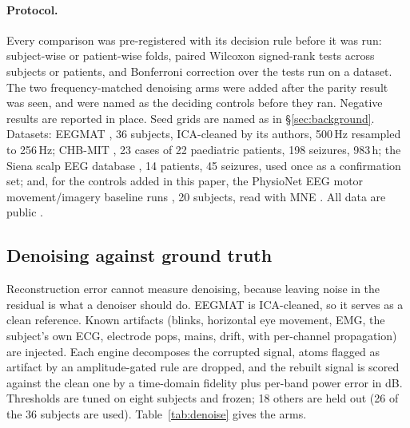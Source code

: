 \documentclass{article}
\begin{document}
\paragraph{Protocol.} Every comparison was pre-registered with its decision rule before it was run: subject-wise or patient-wise folds, paired Wilcoxon signed-rank tests across subjects or patients, and Bonferroni correction over the tests run on a dataset. The two frequency-matched denoising arms were added after the parity result was seen, and were named as the deciding controls before they ran. Negative results are reported in place. Seed grids are named as in \S\ref{sec:background}. Datasets: EEGMAT \citep{zyma2019eegmat}, 36 subjects, ICA-cleaned by its authors, 500\,Hz resampled to 256\,Hz; CHB-MIT \citep{shoeb2009application}, 23 cases of 22 paediatric patients, 198 seizures, 983\,h; the Siena scalp EEG database \citep{detti2020siena}, 14 patients, 45 seizures, used once as a confirmation set; and, for the controls added in this paper, the PhysioNet EEG motor movement/imagery baseline runs \citep{schalk2004bci2000,goldberger2000physionet}, 20 subjects, read with MNE \citep{gramfort2013mne}. All data are public \citep{goldberger2000physionet}.

\subsection{Denoising against ground truth}
\label{sec:denoise}
Reconstruction error cannot measure denoising, because leaving noise in the residual is what a denoiser should do. EEGMAT is ICA-cleaned, so it serves as a clean reference. Known artifacts (blinks, horizontal eye movement, EMG, the subject's own ECG, electrode pops, mains, drift, with per-channel propagation) are injected. Each engine decomposes the corrupted signal, atoms flagged as artifact by an amplitude-gated rule are dropped, and the rebuilt signal is scored against the clean one by a time-domain fidelity plus per-band power error in dB. Thresholds are tuned on eight subjects and frozen; 18 others are held out (26 of the 36 subjects are used). Table~\ref{tab:denoise} gives the arms.
\end{document}
